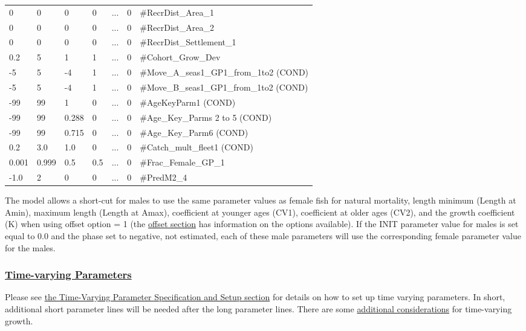 \begin{longtable}{p{1.1cm} p{1.1cm} p{1.1cm} p{1.1cm} p{1.5cm} p{1.1cm} p{6.75cm}}
	 0   & 0    & 0    & 0    & \multicolumn{1}{c}{...} & 0 & \#RecrDist\_Area\_1 \\
	 0   & 0    & 0    & 0    & \multicolumn{1}{c}{...} & 0 & \#RecrDist\_Area\_2 \\
	 0   & 0    & 0    & 0    & \multicolumn{1}{c}{...} & 0 & \#RecrDist\_Settlement\_1 \\
	 0.2 & 5    & 1    & 1    & \multicolumn{1}{c}{...} & 0 & \#Cohort\_Grow\_Dev \\
	-5   & 5    & -4   & 1    & \multicolumn{1}{c}{...} & 0 & \#Move\_A\_seas1\_GP1\_from\_1to2 (COND) \\
    -5   & 5    & -4   & 1    & \multicolumn{1}{c}{...} & 0 & \#Move\_B\_seas1\_GP1\_from\_1to2 (COND) \\
	-99  & 99   &  1   & 0    & \multicolumn{1}{c}{...} & 0 & \#AgeKeyParm1 (COND) \\
	-99  & 99   & 0.288 &  0  &...& 0 & \#Age\_Key\_Parms 2 to 5 (COND) \\
	-99  & 99   & 0.715 &  0  &...& 0 & \#Age\_Key\_Parm6 (COND) \\	
	0.2  & 3.0  & 1.0   &  0  &...& 0 & \#Catch\_mult\_fleet1 (COND) \\
	0.001 & 0.999 & 0.5 & 0.5 &...& 0 & \#Frac\_Female\_GP\_1 \\
	-1.0 & 2 & 0 & 0    &...& 0 & \#PredM2\_4 \Bstrut\\		
	\hline
\end{longtable}

\hypertarget{male-shortcut}{}
The model allows a short-cut for males to use the same parameter values as female fish for natural mortality, length minimum (Length at Amin), maximum length (Length at Amax), coefficient at younger ages (CV1), coefficient at older ages (CV2), and the growth coefficient (K) when using offset option = 1 (the \hyperlink{offset}{offset section} has information on the options available). If the INIT parameter value for males is set equal to 0.0 and the phase set to negative, not estimated, each of these male parameters will use the corresponding female parameter value for the males.

\hypertarget{TVParams}{}
\subsubsection[Time-varying Parameters]{\protect\hyperlink{TVParams}{Time-varying Parameters}}
Please see \hyperlink{tvOrder}{the Time-Varying Parameter Specification and Setup section} for details on how to set up time varying parameters. In short, additional short parameter lines will be needed after the long parameter lines. There are some \hyperlink{tvgrowth}{additional considerations} for time-varying growth.

